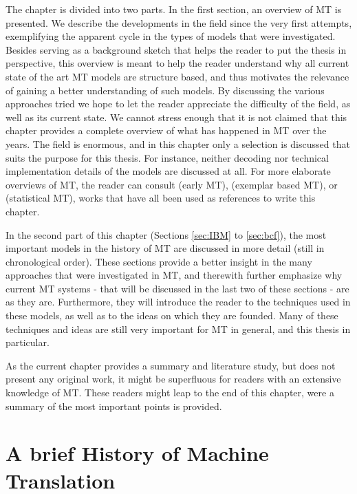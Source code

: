 \documentclass{report}
\theoremstyle{break}
\begin{document}
The chapter is divided into two parts. In the first section, an overview of MT is presented. We describe the developments in the field since the very first attempts, exemplifying the apparent cycle in the types of models that were investigated. Besides serving as a background sketch that helps the reader to put the thesis in perspective, this overview is meant to help the reader understand why all current state of the art MT models are structure based, and thus motivates the relevance of gaining a better understanding of such models. By discussing the various approaches tried we hope to let the reader appreciate the difficulty of the field, as well as its current state. We cannot stress enough that it is not claimed that this chapter provides a complete overview of what has happened in MT over the years. The field is enormous, and in this chapter only a selection is discussed that suits the purpose for this thesis. For instance, neither decoding nor technical implementation details of the models are discussed at all. For more elaborate overviews of MT, the reader can consult \cite{hutchins1992introduction} (early MT), \cite{somers1999review} (exemplar based MT), \cite{koehn2008statistical} or \cite{wu2005mt} (statistical MT), works that have all been used as references to write this chapter.

In the second part of this chapter (Sections \ref{sec:IBM} to \ref{sec:bcf}), the most important models in the history of MT are discussed in more detail (still in chronological order). These sections provide a better insight in the many approaches that were investigated in MT, and therewith further emphasize why current MT systems - that will be discussed in the last two of these sections - are as they are. Furthermore, they will introduce the reader to the techniques used in these models, as well as to the ideas on which they are founded. Many of these techniques and ideas are still very important for MT in general, and this thesis in particular.

As the current chapter provides a summary and literature study, but does not present any original work, it might be superfluous for readers with an extensive knowledge of MT. These readers might leap to the end of this chapter, were a summary of the most important points is provided.

\section{A brief History of Machine Translation}
\label{sec:overview}
\end{document}
